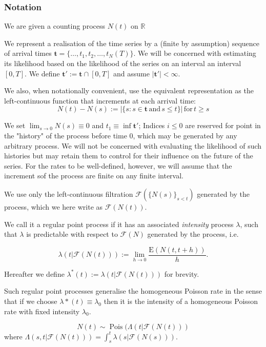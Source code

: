 \documentclass[11pt]{article}
\begin{document}
\subsubsection{Notation}\label{notation}

We are given a counting process \(N(t)\) on \(\mathbb R\)

We represent a realisation of the time series by a (finite by
assumption) sequence of arrival times
\(\mathbf{t}=\{\dots,t_1, t_2,\dots,t_N(T)\}.\) We will be concerned
with estimating its likelihood based on the likelihood of the series on
an interval an interval \([0,T]\). We define
\(\mathbf{t}':=\mathbf{t}\cap [0,T]\) and assume
\(\left|\mathbf{t}'\right|<\infty.\)

We also, when notationally convenient, use the equivalent representation
as the left-continuous function that increments at each arrival time: \[
N(t)-N(s):= \left|\{s:s\in \mathbf{t}\,\mathrm{and}\,s\leq t\}\right| \,\mathrm{ for }\, t\geq s
\]

We set \(\lim_{s\rightarrow 0} N(s)\equiv 0\) and
\(t_1\equiv \inf \mathbf{t}'\); Indices \(i\leq 0\) are reserved for
point in the "history" of the process before time \(0\), which may be
generated by any arbitrary process. We will not be concerned with
evaluating the likelihood of such histories but may retain them to
control for their influence on the future of the series. For the rates
to be well-defined, however, we will assume that the increment sof the
process are finite on any finite interval.

We use only the left-continuous filtration
\(\mathcal{F}(\{N(s)\}_{s < t})\) generated by the process, which we
here write as \(\mathcal{F}(N(t)).\)

We call it a regular point process if it has an associated
\emph{intensity} process \(\lambda\), such that \(\lambda\) is
predictable with respect to \(\mathcal{F}(N)\) generated by the process,
i.e. \cite{daley_introduction_2003}

\[\lambda(t|\mathcal{F}(N(t))):=\lim_{h\to 0} \frac{\mathrm E\left(N(t,t+h)\right)}{h}.\]

Hereafter we define \(\lambda^*(t):=\lambda(t|\mathcal{F}(N(t)))\) for
brevity.

Such regular point processes generalise the homogeneous Poisson rate in
the sense that if we choose \(\lambda*(t)\equiv \lambda_0\) then it is
the intensity of a homogeneous Poisson rate with fixed intensity
\(\lambda_0\).

    \[N(t)\sim \operatorname{Pois}(\Lambda(t|\mathcal{F}(N(t)))\] where
\(\Lambda(s,t|\mathcal{F}(N(t)))=\int_s^t \lambda(s|\mathcal{F}(N(s))).\)
\end{document}
